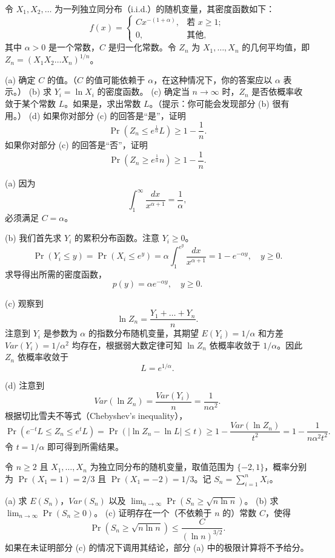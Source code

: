 \begin{questions}
\question
令 $X_1, X_2, \dots$ 为一列独立同分布（i.i.d.）的随机变量，其密度函数如下：
\[
f(x) = \begin{cases} Cx^{-(1+\alpha)}, & \text{若 } x \ge 1; \\ 0, & \text{其他}, \end{cases}
\]
其中 $\alpha > 0$ 是一个常数，$C$ 是归一化常数。令 $Z_n$ 为 $X_1, \dots, X_n$ 的几何平均值，即 $Z_n = (X_1 X_2 \dots X_n)^{1/n}$。

(a) 确定 $C$ 的值。（$C$ 的值可能依赖于 $\alpha$，在这种情况下，你的答案应以 $\alpha$ 表示。）
(b) 求 $Y_i = \ln X_i$ 的密度函数。
(c) 确定当 $n \to \infty$ 时，$Z_n$ 是否依概率收敛于某个常数 $L$。如果是，求出常数 $L$。（提示：你可能会发现部分 (b) 很有用。）
(d) 如果你对部分 (c) 的回答是“是”，证明
\[
\Pr\left( Z_n \le e^{\frac{1}{\alpha}} L \right) \ge 1 - \frac{1}{n}.
\]
如果你对部分 (c) 的回答是“否”，证明
\[
\Pr\left( Z_n \ge e^{\frac{1}{\alpha}} n \right) \ge 1 - \frac{1}{n}.
\]

\begin{solution}
(a) 因为
\[
\int_1^{\infty} \frac{dx}{x^{\alpha+1}} = \frac{1}{\alpha},
\]
必须满足 $C = \alpha$。

(b) 我们首先求 $Y_i$ 的累积分布函数。注意 $Y_i \ge 0$。
\[
\Pr(Y_i \le y) = \Pr(X_i \le e^y) = \alpha \int_1^{e^y} \frac{dx}{x^{\alpha+1}} = 1 - e^{-\alpha y}, \quad y \ge 0.
\]
求导得出所需的密度函数，
\[
p(y) = \alpha e^{-\alpha y}, \quad y \ge 0.
\]

(c) 观察到
\[
\ln Z_n = \frac{Y_1 + \dots + Y_n}{n}.
\]
注意到 $Y_i$ 是参数为 $\alpha$ 的指数分布随机变量，其期望 $E(Y_i) = 1/\alpha$ 和方差 $Var(Y_i) = 1/\alpha^2$ 均存在，根据弱大数定律可知 $\ln Z_n$ 依概率收敛于 $1/\alpha$。因此 $Z_n$ 依概率收敛于
\[
L = e^{1/\alpha}.
\]

(d) 注意到
\[
Var(\ln Z_n) = \frac{Var(Y_i)}{n} = \frac{1}{n\alpha^2}.
\]
根据切比雪夫不等式（Chebyshev's inequality），
\[
\Pr(e^{-t} L \le Z_n \le e^t L) = \Pr(|\ln Z_n - \ln L| \le t) \ge 1 - \frac{Var(\ln Z_n)}{t^2} = 1 - \frac{1}{n\alpha^2 t^2}.
\]
令 $t = 1/\alpha$ 即可得到所需结果。
\end{solution}

\question
令 $n \ge 2$ 且 $X_1, \dots, X_n$ 为独立同分布的随机变量，取值范围为 $\{-2, 1\}$，概率分别为 $\Pr(X_1 = 1) = 2/3$ 且 $\Pr(X_1 = -2) = 1/3$。记 $S_n = \sum_{i=1}^n X_i$。

(a) 求 $E(S_n)$，$Var(S_n)$ 以及 $\lim_{n \to \infty} \Pr(S_n \ge \sqrt{n \ln n})$。
(b) 求 $\lim_{n \to \infty} \Pr(S_n \ge 0)$。
(c) 证明存在一个（不依赖于 $n$ 的）常数 $C$，使得
\[
\Pr(S_n \ge \sqrt{n \ln n}) \le \frac{C}{(\ln n)^{3/2}}.
\]
如果在未证明部分 (c) 的情况下调用其结论，部分 (a) 中的极限计算将不予给分。


\end{questions}
